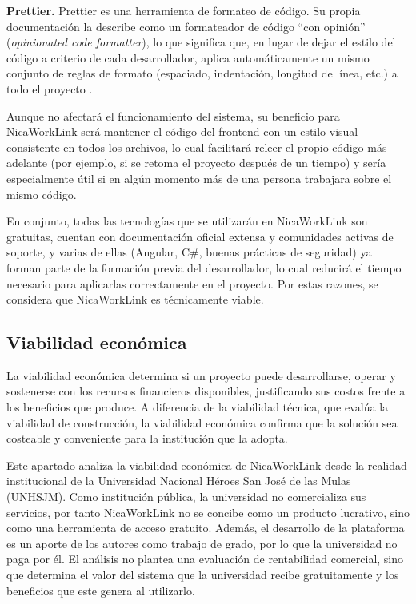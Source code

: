 \textbf{Prettier.} Prettier es una herramienta de formateo de código. Su propia documentación la describe como un formateador de código ``con opinión'' (\textit{opinionated code formatter}), lo que significa que, en lugar de dejar el estilo del código a criterio de cada desarrollador, aplica automáticamente un mismo conjunto de reglas de formato (espaciado, indentación, longitud de línea, etc.) a todo el proyecto \parencite{prettier}.

Aunque no afectará el funcionamiento del sistema, su beneficio para NicaWorkLink será mantener el código del frontend con un estilo visual consistente en todos los archivos, lo cual facilitará releer el propio código más adelante (por ejemplo, si se retoma el proyecto después de un tiempo) y sería especialmente útil si en algún momento más de una persona trabajara sobre el mismo código.

En conjunto, todas las tecnologías que se utilizarán en NicaWorkLink son gratuitas, cuentan con documentación oficial extensa y comunidades activas de soporte, y varias de ellas (Angular, C\#, buenas prácticas de seguridad) ya forman parte de la formación previa del desarrollador, lo cual reducirá el tiempo necesario para aplicarlas correctamente en el proyecto. Por estas razones, se considera que NicaWorkLink es técnicamente viable.

\newpage

\subsection{Viabilidad económica}

La viabilidad económica determina si un proyecto puede desarrollarse, operar y sostenerse con los recursos financieros disponibles, justificando sus costos frente a los beneficios que produce. A diferencia de la viabilidad técnica, que evalúa la viabilidad de construcción, la viabilidad económica confirma que la solución sea costeable y conveniente para la institución que la adopta.

Este apartado analiza la viabilidad económica de NicaWorkLink desde la realidad institucional de la Universidad Nacional Héroes San José de las Mulas (UNHSJM). Como institución pública, la universidad no comercializa sus servicios, por tanto NicaWorkLink no se concibe como un producto lucrativo, sino como una herramienta de acceso gratuito. Además, el desarrollo de la plataforma es un aporte de los autores como trabajo de grado, por lo que la universidad no paga por él. El análisis no plantea una evaluación de rentabilidad comercial, sino que determina el valor del sistema que la universidad recibe gratuitamente y los beneficios que este genera al utilizarlo.

